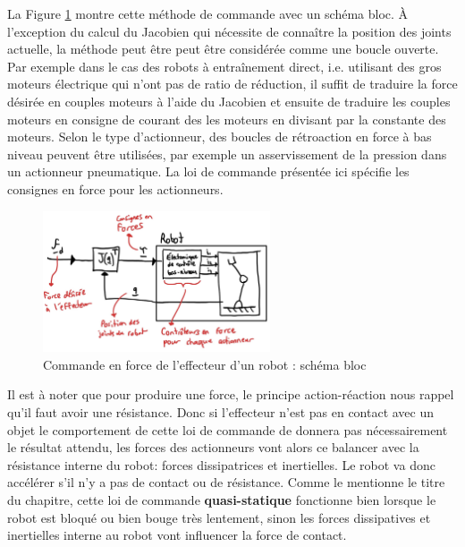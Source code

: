 La Figure \ref{fig:forcecontroleffectorbloc} montre cette méthode de commande avec un schéma bloc. À l'exception du calcul du Jacobien qui nécessite de connaître la position des joints actuelle, la méthode peut être peut être considérée comme une boucle ouverte.  Par exemple dans le cas des robots à entraînement direct, i.e. utilisant des gros moteurs électrique qui n'ont pas de ratio de réduction, il suffit de traduire la force désirée en couples moteurs à l'aide du Jacobien et ensuite de traduire les couples moteurs en consigne de courant des les moteurs en divisant par la constante des moteurs. Selon le type d'actionneur, des boucles de rétroaction en force à bas niveau peuvent être utilisées, par exemple un asservissement de la pression dans un actionneur pneumatique. La loi de commande présentée ici spécifie les consignes en force pour les actionneurs.
\begin{figure}[H]
	\centering
		\includegraphics[width=0.60\textwidth]{fig/forcecontroleffectorbloc.jpg}
	\caption{Commande en force de l'effecteur d'un robot : schéma bloc}
	\label{fig:forcecontroleffectorbloc}
\end{figure}

Il est à noter que pour produire une force, le principe action-réaction nous rappel qu'il faut avoir une résistance. Donc si l'effecteur n'est pas en contact avec un objet le comportement de cette loi de commande de donnera pas nécessairement le résultat attendu, les forces des actionneurs vont alors ce balancer avec la résistance interne du robot: forces dissipatrices et inertielles. Le robot va donc accélérer s'il n'y a pas de contact ou de résistance. Comme le mentionne le titre du chapitre, cette loi de commande \textbf{quasi-statique} fonctionne bien lorsque le robot est bloqué ou bien bouge très lentement, sinon les forces dissipatives et inertielles interne au robot vont influencer la force de contact. 



